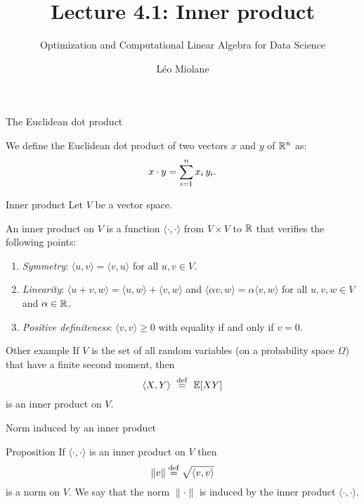 \documentclass{beamer}
\title{Lecture 4.1: Inner product}
\subtitle{Optimization and Computational Linear Algebra for Data Science}
\author{Léo Miolane}
\date{}
\begin{document}
\setcounter{showProgressBar}{0}
\setcounter{showSlideNumbers}{0}

\frame{\titlepage}

\setcounter{framenumber}{0}
\setcounter{showSlideNumbers}{1}
\begin{frame}[t]{The Euclidean dot product}
	\vspace{-0.3cm}
	\begin{definition}
		We define the Euclidean dot product of two vectors $x$ and $y$ of $\mathbb{R}^n$ as:
		\vspace{-0.3cm}
		$$
		x \cdot y = \sum_{i=1}^n x_i \, y_i.
		\vspace{-0.3cm}
		$$
	\end{definition}


\end{frame}

\begin{frame}[t]{Inner product}
	Let $V$ be a vector space.
	\begin{definition}
		An inner product on $V$ is a function $\langle \cdot, \cdot \rangle$ from $V \times V$ to $\mathbb{R}$ that verifies the following points:
		\begin{enumerate}
			\item \emph{Symmetry}: $\langle u, v \rangle = \langle v, u\rangle$ for all $u,v \in V$.
			\item \emph{Linearity}: $\langle u+v, w \rangle = \langle u, w\rangle + \langle v, w\rangle$ and $\langle \alpha v, w \rangle = \alpha \langle v, w \rangle$ for all $u,v,w \in V$ and $\alpha \in \mathbb{R}$.
			\item \emph{Positive definiteness}: $\langle v, v\rangle \geq 0$ with equality if and only if $v = 0$.
		\end{enumerate}
	\end{definition}
\end{frame}


\begin{frame}[t]{Other example}
	If $V$ is the set of all random variables (on a probability space $\Omega$) that have a finite second moment, then 
	$$\langle X, Y \rangle \ \overset{\rm def}{=}  \ \mathbb{E}[XY]$$
	is an inner product on $V$.
\end{frame}
\begin{frame}[t]{Norm induced by an inner product}
	\vspace{-0.3cm}
	\begin{block}{Proposition}
		If $\langle \cdot, \cdot \rangle$ is an inner product on $V$ then 
		$$
		\| v \| \overset{\rm def}{=} \sqrt{\langle v, v \rangle}
		$$ 
		is a norm on $V$. We say  that the norm $\| \cdot \|$ is induced by the inner product $\langle \cdot, \cdot \rangle$.
	\end{block}
\end{frame}
\end{document}
